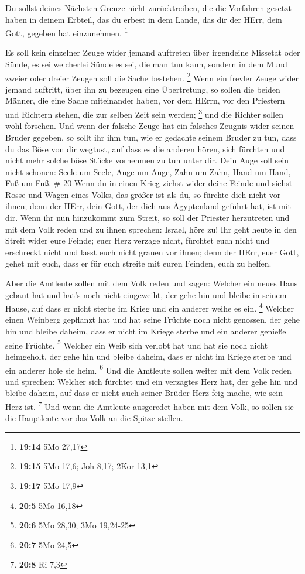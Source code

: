  Du sollst deines Nächsten Grenze nicht zurücktreiben, die
die Vorfahren gesetzt haben in deinem Erbteil, das du erbest in dem
Lande, das dir der HErr, dein Gott, gegeben hat einzunehmen. \footnote{\textbf{19:14}
  5Mo 27,17}

 Es soll kein einzelner Zeuge wider jemand auftreten über
irgendeine Missetat oder Sünde, es sei welcherlei Sünde es sei, die man
tun kann, sondern in dem Mund zweier oder dreier Zeugen soll die Sache
bestehen. \footnote{\textbf{19:15} 5Mo 17,6; Joh 8,17; 2Kor 13,1}
 Wenn ein frevler Zeuge wider jemand auftritt, über ihn zu
bezeugen eine Übertretung,  so sollen die beiden Männer,
die eine Sache miteinander haben, vor dem HErrn, vor den Priestern und
Richtern stehen, die zur selben Zeit sein werden; \footnote{\textbf{19:17}
  5Mo 17,9}  und die Richter sollen wohl forschen. Und wenn
der falsche Zeuge hat ein falsches Zeugnis wider seinen Bruder gegeben,
 so sollt ihr ihm tun, wie er gedachte seinem Bruder zu
tun, dass du das Böse von dir wegtust,  auf dass es die
anderen hören, sich fürchten und nicht mehr solche böse Stücke vornehmen
zu tun unter dir.  Dein Auge soll sein nicht schonen: Seele
um Seele, Auge um Auge, Zahn um Zahn, Hand um Hand, Fuß um Fuß. \# 20
 Wenn du in einen Krieg ziehst wider deine Feinde und siehst
Rosse und Wagen eines Volks, das größer ist als du, so fürchte dich
nicht vor ihnen; denn der HErr, dein Gott, der dich aus Ägyptenland
geführt hat, ist mit dir.  Wenn ihr nun hinzukommt zum
Streit, so soll der Priester herzutreten und mit dem Volk reden
 und zu ihnen sprechen: Israel, höre zu! Ihr geht heute in
den Streit wider eure Feinde; euer Herz verzage nicht, fürchtet euch
nicht und erschreckt nicht und lasst euch nicht grauen vor ihnen;
 denn der HErr, euer Gott, gehet mit euch, dass er für euch
streite mit euren Feinden, euch zu helfen.

 Aber die Amtleute sollen mit dem Volk reden und sagen:
Welcher ein neues Haus gebaut hat und hat's noch nicht eingeweiht, der
gehe hin und bleibe in seinem Hause, auf dass er nicht sterbe im Krieg
und ein anderer weihe es ein. \footnote{\textbf{20:5} 5Mo 16,18}
 Welcher einen Weinberg gepflanzt hat und hat seine Früchte
noch nicht genossen, der gehe hin und bleibe daheim, dass er nicht im
Kriege sterbe und ein anderer genieße seine Früchte. \footnote{\textbf{20:6}
  5Mo 28,30; 3Mo 19,24-25}  Welcher ein Weib sich verlobt
hat und hat sie noch nicht heimgeholt, der gehe hin und bleibe daheim,
dass er nicht im Kriege sterbe und ein anderer hole sie heim.
\footnote{\textbf{20:7} 5Mo 24,5}  Und die Amtleute sollen
weiter mit dem Volk reden und sprechen: Welcher sich fürchtet und ein
verzagtes Herz hat, der gehe hin und bleibe daheim, auf dass er nicht
auch seiner Brüder Herz feig mache, wie sein Herz ist. \footnote{\textbf{20:8}
  Ri 7,3}  Und wenn die Amtleute ausgeredet haben mit dem
Volk, so sollen sie die Hauptleute vor das Volk an die Spitze stellen.


